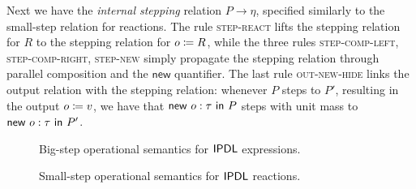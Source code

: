 Next we have the \emph{internal stepping} relation $P \to \eta$, specified similarly to the small-step relation for reactions. The rule \textsc{step-react} lifts the stepping relation for $R$ to the stepping relation for $o \coloneqq R$, while the three rules \textsc{step-comp-left}, \textsc{step-comp-right}, \textsc{step-new} simply propagate the stepping relation through parallel composition and the $\mathsf{new}$ quantifier. The last rule \textsc{out-new-hide} links the output relation with the stepping relation: whenever $P$ steps to $P'$, resulting in the output $o \coloneqq v$, we have that $\mathsf{new} \ o : \tau \ \mathsf{in} \ P$ steps with unit mass to $\mathsf{new} \ o : \tau \ \mathsf{in} \ P'$.

\begin{figure}
\caption{Big-step operational semantics for $\textsf{IPDL}$ expressions.}
\label{fig:expressions_semantics}
\end{figure}

\begin{figure}
\caption{Small-step operational semantics for $\textsf{IPDL}$ reactions.} 
\label{fig:reactions_semantics}
\end{figure}

